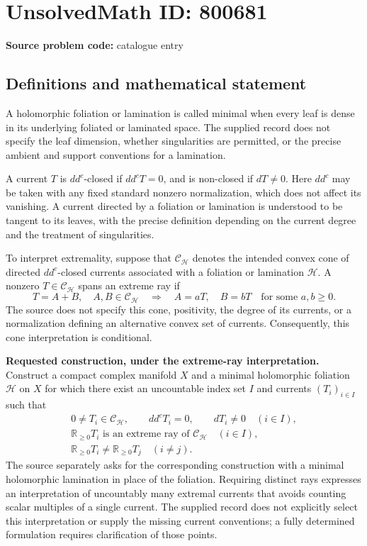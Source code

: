 \documentclass[11pt]{article}
\newcommand{\R}{\mathbb{R}}
\begin{document}
\section*{UnsolvedMath ID: 800681}
\textbf{Source problem code:} catalogue entry
\subsection{Definitions and mathematical statement}
A holomorphic foliation or lamination is called minimal when every leaf is dense in its underlying foliated or laminated space. The supplied record does not specify the leaf dimension, whether singularities are permitted, or the precise ambient and support conventions for a lamination.

A current \(T\) is \(dd^c\)-closed if \(dd^cT=0\), and is non-closed if \(dT\ne0\). Here \(dd^c\) may be taken with any fixed standard nonzero normalization, which does not affect its vanishing. A current directed by a foliation or lamination is understood to be tangent to its leaves, with the precise definition depending on the current degree and the treatment of singularities.

To interpret extremality, suppose that \(\mathcal C_{\mathcal H}\) denotes the intended convex cone of directed \(dd^c\)-closed currents associated with a foliation or lamination \(\mathcal H\). A nonzero \(T\in\mathcal C_{\mathcal H}\) spans an extreme ray if
\[
 T=A+B,\quad A,B\in\mathcal C_{\mathcal H}
 \quad\Longrightarrow\quad
 A=aT,\quad B=bT\quad\text{for some }a,b\ge0.
\]
The source does not specify this cone, positivity, the degree of its currents, or a normalization defining an alternative convex set of currents. Consequently, this cone interpretation is conditional.

\textbf{Requested construction, under the extreme-ray interpretation.} Construct a compact complex manifold \(X\) and a minimal holomorphic foliation \(\mathcal H\) on \(X\) for which there exist an uncountable index set \(I\) and currents \((T_i)_{i\in I}\) such that
\[
\begin{gathered}
0\ne T_i\in\mathcal C_{\mathcal H},\qquad
 dd^cT_i=0,\qquad dT_i\ne0
 \quad(i\in I),\\
\R_{\ge0}T_i\text{ is an extreme ray of }\mathcal C_{\mathcal H}
 \quad(i\in I),\\
\R_{\ge0}T_i\ne\R_{\ge0}T_j\quad(i\ne j).
\end{gathered}
\]
The source separately asks for the corresponding construction with a minimal holomorphic lamination in place of the foliation. Requiring distinct rays expresses an interpretation of uncountably many extremal currents that avoids counting scalar multiples of a single current. The supplied record does not explicitly select this interpretation or supply the missing current conventions; a fully determined formulation requires clarification of those points.
\end{document}
